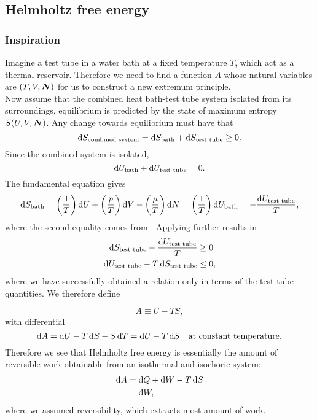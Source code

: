 \subsection{Helmholtz free energy}
\subsubsection{Inspiration}
\label{A_insp}
Imagine a test tube in a water bath at a fixed temperature $T$, which act as a thermal reservoir. Therefore we need to find a function $A$ whose natural variables are $(T,V,\boldsymbol{N})$ for us to construct a new extremum principle. \\
Now assume that the combined heat bath-test tube system isolated from its surroundings, equilibrium is predicted by the state of maximum entropy $S(U,V,\boldsymbol{N})$. Any change towards equilibrium must have that
\begin{equation}
\label{sbathstt}
\dif S_{\text{combined system}}=\dif S_{\text{bath}}+\dif S_{\text{test tube}}\geq0.
\end{equation}
Since the combined system is isolated, 
\begin{equation}
\label{ubathutt}
\dif U_{\text{bath}}+\dif U_{\text{test tube}}=0.
\end{equation}
The fundamental equation gives 
\begin{equation}
\dif S_{\text{bath}}=\left(\frac{1}{T}\right)\dif U+\left(\frac{p}{T}\right)\dif V-\left(\frac{\mu}{T}\right)\dif N=\left(\frac{1}{T}\right)\dif U_{\text{bath}}=-\frac{\dif U_{\text{test tube}}}{T}, 
\end{equation}
where the second equality comes from . Applying  further results in
\begin{subequations}
\begin{align}
\dif S_{\text{test tube}}-\frac{\dif U_{\text{test tube}}}{T}&\geq0\\
\dif U_{\text{test tube}}-T\dif S_{\text{test tube}}&\leq0, 
\end{align}
\end{subequations}
where we have successfully obtained a relation only in terms of the test tube quantities. We therefore define 
\begin{defi}
\begin{equation}
A\equiv U-TS, 
\end{equation}
with differential 
\begin{equation}
\dif A=\dif U-T\dif S-S\dif T=\dif U-T\dif S\ \ \ \text{at constant temperature.}
\end{equation}
Therefore we see that Helmholtz free energy is essentially the amount of reversible work obtainable from an isothermal and isochoric system:
\begin{equation}
\begin{aligned}
\dif A&=\indiff Q+\indiff W-T\dif S\\
&=\indiff W, 
\end{aligned}
\end{equation}
where we assumed reversibility, which extracts most amount of work.
\end{defi}
